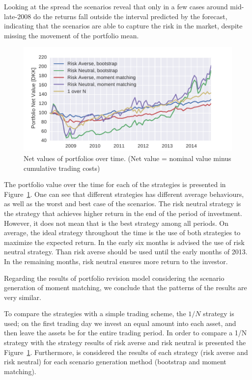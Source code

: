 Looking at the spread the scenarios reveal that only in a few cases around mid-late-2008 do the returns fall outside the interval predicted by the forecast, indicating that the scenarios are able to capture the risk in the market, despite missing the movement of the portfolio mean.

\begin{figure}[tpb]
\centering
\includegraphics{../pic/trading_portfolio_value.pdf}
\caption{Net values of portfolios over time. (Net value = nominal value minus cumulative trading costs)}
\label{fig:tradingportfoliovalues}
\end{figure}



The portfolio value over the time for each of the strategies is presented in Figure~\ref{fig:tradingportfoliovalues}.
One can see that different strategies has different average behaviours, as well as the worst and best case of the scenarios.
The risk neutral strategy is the strategy that achieves higher return in the end of the period of investment. 
However, it does not mean that is the best strategy among all periods.
On average, the ideal strategy throughout the time is the use of both strategies to maximize the expected return.
In the early six months is advised the use of risk neutral strategy.
Than risk averse should be used until the early months of 2013.
In the remaining months, risk neutral ensures more return to the investor.

Regarding the results of portfolio revision model considering the scenario generation of moment matching, we conclude that the patterns of the results are very similar.

To compare the strategies with a simple trading scheme, the $1/N$ strategy is used; on the first trading day we invest an equal amount into each asset, and then leave the assets be for the entire trading period.
In order to compare a 1/N strategy with the strategy results of risk averse and risk neutral is presented the Figure~\ref{fig:tradingportfoliovalues}.
Furthermore, is considered the results of each strategy (risk averse and risk neutral) for each scenario generation method (bootstrap and moment matching).

